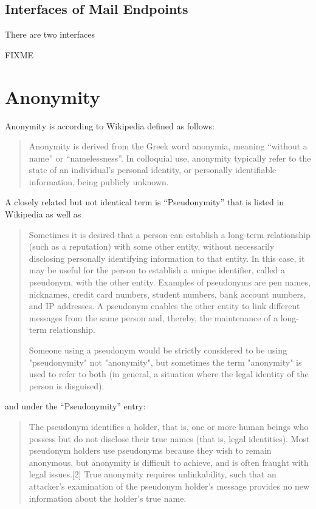 \subsection{Interfaces of Mail Endpoints}
There are two interfaces 

FIXME

\section{Anonymity}
\cite{anon_terminology}

Anonymity is according to Wikipedia\cite{wiki:anonymity} defined as follows:
\begin{quote}
Anonymity is derived from the Greek word anonymia, meaning "`without a name"' or "`namelessness"'. In colloquial use, anonymity typically refer to the state of an individual's personal identity, or personally identifiable information, being publicly unknown.
\end{quote}
A closely related but not identical term is "`Pseudonymity"' that is listed in Wikipedia as well as
\begin{quote}
Sometimes it is desired that a person can establish a long-term relationship (such as a reputation) with some other entity, without necessarily disclosing personally identifying information to that entity. In this case, it may be useful for the person to establish a unique identifier, called a pseudonym, with the other entity. Examples of pseudonyms are pen names, nicknames, credit card numbers, student numbers, bank account numbers, and IP addresses. A pseudonym enables the other entity to link different messages from the same person and, thereby, the maintenance of
a long-term relationship. \par
Someone using a pseudonym would be strictly considered to be using "pseudonymity" not "anonymity", but sometimes the term "anonymity" is used to refer to both (in general, a situation where the legal identity of the person is disguised).
\end{quote}
and under the "`Pseudonymity"' \cite{wiki:pseudonymity} entry:
\begin{quote}
The pseudonym identifies a holder, that is, one or more human beings who possess but do not disclose their true names (that is, legal identities). Most pseudonym holders use pseudonyms because they wish to remain anonymous, but anonymity is difficult to achieve, and is often fraught with legal issues.[2] True anonymity requires unlinkability, such that an attacker's examination of the pseudonym holder's message provides no new information about the holder's true name.
\end{quote}

